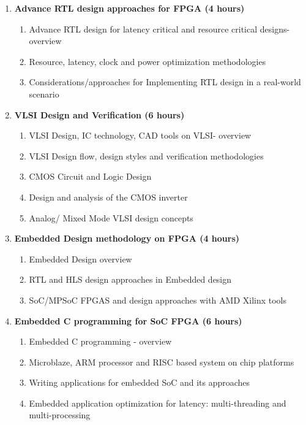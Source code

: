 \begin{enumerate}
  \item \textbf{Advance RTL design approaches for FPGA \hfill (4 hours)}
    \begin{enumerate}
      \item Advance RTL design for latency critical and resource critical designs- overview
      \item Resource, latency, clock and power optimization methodologies
      \item Considerations/approaches for Implementing RTL design in a real-world scenario
    \end{enumerate}
    \vs

  \item \textbf{VLSI Design and Verification \hfill (6 hours)}
    \begin{enumerate}
      \item VLSI Design, IC technology, CAD tools on VLSI- overview
      \item VLSI Design flow, design styles and verification methodologies
      \item CMOS Circuit and Logic Design
      \item Design and analysis of the CMOS inverter
      \item Analog/ Mixed Mode VLSI design concepts
    \end{enumerate}
    \vs
    
  \item \textbf{Embedded Design methodology on FPGA \hfill (4 hours)}
    \begin{enumerate}
      \item Embedded Design overview
      \item RTL and HLS design approaches in Embedded design
      \item SoC/MPSoC FPGAS and design approaches with AMD Xilinx tools
    \end{enumerate}
    \vs
    
  \item \textbf{Embedded C programming for SoC FPGA \hfill (6 hours)}
    \begin{enumerate}
      \item Embedded C programming - overview
      \item Microblaze, ARM processor and RISC based system on chip platforms
      \item Writing applications for embedded SoC and its approaches
      \item Embedded application optimization for latency: multi-threading and multi-processing
    \end{enumerate}
    \vs


\end{enumerate}
